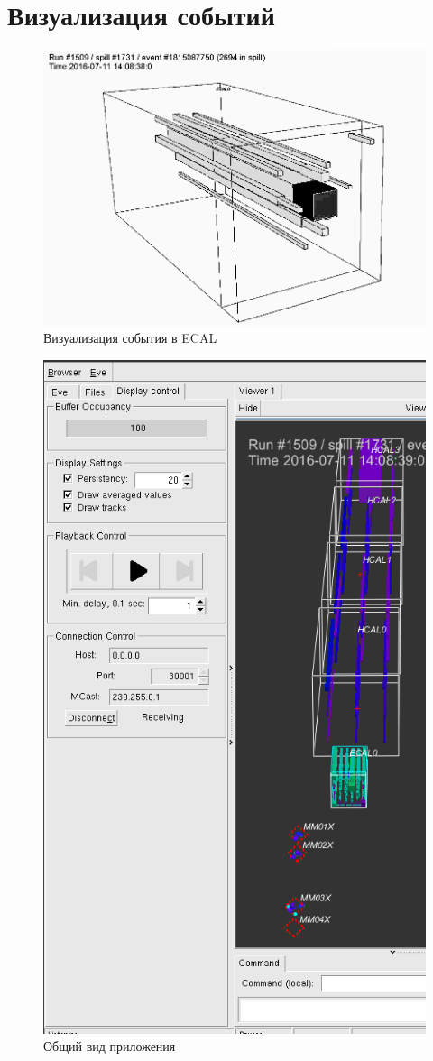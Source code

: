 \section{Визуализация событий}

\begin{figure}
    \centering
    \includegraphics[width=0.5\linewidth]{images//illustrative/ecal-evidplay-example-3d.png}
    \caption{Визуализация события в ECAL}
    \label{fig:event-display-ecal-only}
\end{figure}

\begin{figure}
    \centering
    \includegraphics[width=0.25\linewidth]{images//illustrative/event-display-mult.png}
    \caption{Общий вид приложения}
    \label{fig:event-display-3d}
\end{figure}
